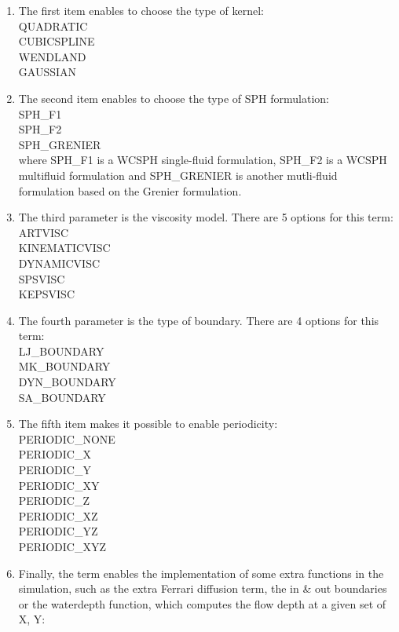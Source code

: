 \documentclass{../GPUSPHtemplate}
\begin{document}
\begin{enumerate}
\item The first item enables to choose the type of kernel:\\
QUADRATIC\\
CUBICSPLINE\\
WENDLAND\\
GAUSSIAN\\
\item The second item enables to choose the type of SPH formulation:\\
SPH\_F1\\
SPH\_F2\\
SPH\_GRENIER\\
where SPH\_F1 is a WCSPH single-fluid formulation, SPH\_F2 is a WCSPH multifluid formulation and
SPH\_GRENIER is another mutli-fluid formulation based on the Grenier formulation.
\item The third parameter is the viscosity model. There are 5 options for this term: \\
ARTVISC\\
KINEMATICVISC\\
DYNAMICVISC\\
SPSVISC\\
KEPSVISC\\
\item The fourth parameter is the type of boundary. There are 4 options for this term:\\
LJ\_BOUNDARY\\
MK\_BOUNDARY\\
DYN\_BOUNDARY\\
SA\_BOUNDARY\\
\item The fifth item makes it possible to enable periodicity:\\
  PERIODIC\_NONE \\
  PERIODIC\_X \\
  PERIODIC\_Y \\
  PERIODIC\_XY \\
  PERIODIC_Z \\
  PERIODIC_XZ \\
  PERIODIC_YZ \\
  PERIODIC_XYZ \\
\item Finally, the  term enables the implementation 
of some extra functions in the simulation, such as the extra Ferrari diffusion term, 
the in \& out boundaries or the waterdepth function, 
which computes the flow depth at a given set of X, Y:\\

\end{enumerate}
\end{document}
